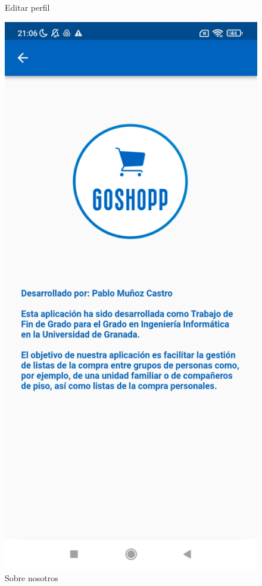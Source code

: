 \documentclass{article}
\begin{document}
\begin{figure}[htbp]
\begin{minipage}[h]{0.32\textwidth}
        \caption{Editar perfil}
    \end{minipage}
    \hfill
    \begin{minipage}[h]{0.32\textwidth}
        \includegraphics[width=\textwidth]{imagenes/pantallas/info.jpg}
        \caption{Sobre nosotros}
    \end{minipage}
\end{figure}
\end{document}
